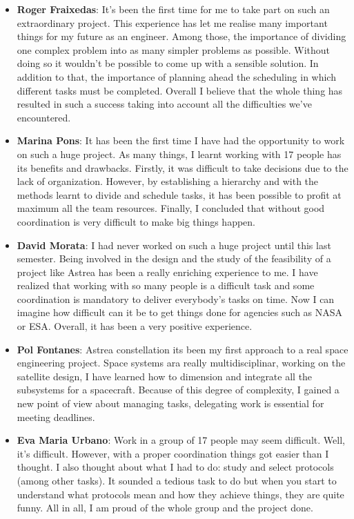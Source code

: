 {\begin{itemize}
 
\item \textbf{Roger Fraixedas}: It's been the first time for me to take part on such an extraordinary project. This experience has let me realise many important things for my future as an engineer. Among those, the importance of dividing one complex problem into as many simpler problems as possible. Without doing so it wouldn't be possible to come up with a sensible solution. In addition to that, the importance of planning ahead the scheduling in which different tasks must be completed. Overall I believe that the whole thing has resulted in such a success taking into account all the difficulties we've encountered.

 
\item \textbf{Marina Pons}: It has been the first time I have had the opportunity to work on such a huge project. As many things, I learnt working with 17 people has its benefits and drawbacks. Firstly, it was difficult to take decisions due to the lack of organization. However, by establishing a hierarchy and with the methods learnt to divide and schedule tasks, it has been possible to profit at maximum all the team resources. Finally, I concluded that without good coordination is very difficult to make big things happen.

 
\item \textbf{David Morata}: I had never worked on such a huge project until this last semester. Being involved in the design and the study of the feasibility of a project like Astrea has been a really enriching experience to me. I have realized that working with so many people is a difficult task and some coordination is mandatory to deliver everybody's tasks on time. Now I can imagine how difficult can it be to get things done for agencies such as NASA or ESA. Overall, it has been a very positive experience. 

 
\item \textbf{Pol Fontanes}: Astrea constellation  its been my first approach to a real space engineering project. Space systems ara really multidisciplinar, working on the satellite design, I have learned how to dimension and integrate all the subsystems for a spacecraft. Because of this degree of complexity, I gained a new point of view about managing tasks, delegating work is essential for meeting deadlines.

 
\item \textbf{Eva Maria Urbano}: Work in a group of 17 people may seem difficult. Well, it's difficult. However, with a proper coordination things got easier than I thought. I also thought about what I had to do: study and select protocols (among other tasks). It sounded a tedious task to do but when you start to understand what protocols mean and how they achieve things, they are quite funny. All in all, I am proud of the whole group and the project done.


\end{itemize}}
